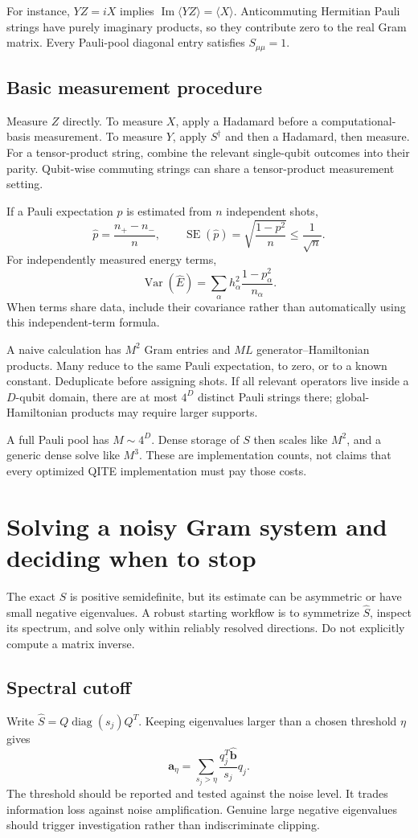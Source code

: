 \documentclass[11pt,a4paper]{article}
\newcommand{\ex}[1]{\langle #1\rangle}
\newcommand{\Var}{\operatorname{Var}}
\newcommand{\Ima}{\operatorname{Im}}
\newcommand{\lesson}[2]{\clearpage\section{#1}\label{#2}}
\begin{document}
For instance, $YZ=iX$ implies $\Ima\ex{YZ}=\ex{X}$. Anticommuting Hermitian Pauli strings have purely imaginary products, so they contribute zero to the real Gram matrix. Every Pauli-pool diagonal entry satisfies $S_{\mu\mu}=1$.

\subsection*{Basic measurement procedure}
Measure $Z$ directly. To measure $X$, apply a Hadamard before a computational-basis measurement. To measure $Y$, apply $S^\dagger$ and then a Hadamard, then measure. For a tensor-product string, combine the relevant single-qubit outcomes into their parity. Qubit-wise commuting strings can share a tensor-product measurement setting.

If a Pauli expectation $p$ is estimated from $n$ independent shots,
\[
\widehat p=\frac{n_+-n_-}{n},\qquad
\operatorname{SE}(\widehat p)=\sqrt{\frac{1-p^2}{n}}\le\frac{1}{\sqrt n}.
\]
For independently measured energy terms,
\[
\Var(\widehat E)=\sum_\alpha h_\alpha^2\frac{1-p_\alpha^2}{n_\alpha}.
\]
When terms share data, include their covariance rather than automatically using this independent-term formula.

\begin{idea}
A naive calculation has $M^2$ Gram entries and $ML$ generator--Hamiltonian products. Many reduce to the same Pauli expectation, to zero, or to a known constant. Deduplicate before assigning shots. If all relevant operators live inside a $D$-qubit domain, there are at most $4^D$ distinct Pauli strings there; global-Hamiltonian products may require larger supports.
\end{idea}

A full Pauli pool has $M\sim4^D$. Dense storage of $S$ then scales like $M^2$, and a generic dense solve like $M^3$. These are implementation counts, not claims that every optimized QITE implementation must pay those costs.

\lesson{Solving a noisy Gram system and deciding when to stop}{sec:numerics}
The exact $S$ is positive semidefinite, but its estimate can be asymmetric or have small negative eigenvalues. A robust starting workflow is to symmetrize $\widehat S$, inspect its spectrum, and solve only within reliably resolved directions. Do not explicitly compute a matrix inverse.

\subsection*{Spectral cutoff}
Write $\widehat S=Q\operatorname{diag}(s_j)Q^T$. Keeping eigenvalues larger than a chosen threshold $\eta$ gives
\[
\bm a_\eta=\sum_{s_j>\eta}\frac{q_j^T\widehat{\bm b}}{s_j}q_j.
\]
The threshold should be reported and tested against the noise level. It trades information loss against noise amplification. Genuine large negative eigenvalues should trigger investigation rather than indiscriminate clipping.
\end{document}
